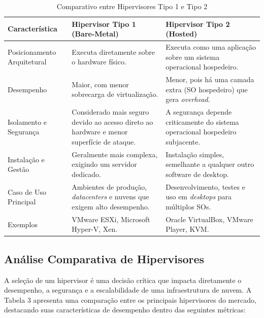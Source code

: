 \begin{table}[H]
    \centering
    \caption{Comparativo entre Hipervisores Tipo 1 e Tipo 2}
    \label{tab:comparativo_hipervisores}

    \begin{tabularx}{\textwidth}{|>{\raggedright\arraybackslash}p{}
                                 |>{\raggedright\arraybackslash}X
                                 |>{\raggedright\arraybackslash}X|}
        \hline
        \textbf{Característica} & \textbf{Hipervisor Tipo 1 (Bare-Metal)}
                                & \textbf{Hipervisor Tipo 2 (Hosted)} \\ \hline
        Posicionamento Arquitetural
            & Executa diretamente sobre o hardware físico.
            & Executa como uma aplicação sobre um sistema operacional hospedeiro. \\ \hline
        Desempenho
            & Maior, com menor sobrecarga de virtualização.
            & Menor, pois há uma camada extra (SO hospedeiro) que gera \textit{overhead}. \\ \hline
        Isolamento e Segurança
            & Considerado mais seguro devido ao acesso direto ao hardware e menor superfície de ataque.
            & A segurança depende criticamente do sistema operacional hospedeiro subjacente. \\ \hline
        Instalação e Gestão
            & Geralmente mais complexa, exigindo um servidor dedicado.
            & Instalação simples, semelhante a qualquer outro software de desktop. \\ \hline
        Caso de Uso Principal
            & Ambientes de produção, \textit{datacenters} e nuvens que exigem alto desempenho.
            & Desenvolvimento, testes e uso em \textit{desktops} para múltiplos SOs. \\ \hline
        Exemplos
            & VMware ESXi, Microsoft Hyper-V, Xen.
            & Oracle VirtualBox, VMware Player, KVM. \\ \hline
    \end{tabularx}

\end{table}



\subsection{Análise Comparativa de Hipervisores}
A seleção de um hipervisor é uma decisão crítica que impacta diretamente o desempenho, a segurança e a escalabilidade de uma infraestrutura de nuvem. A Tabela 3 apresenta uma comparação entre os principais hipervisores do mercado, destacando suas características de desempenho dentro das seguintes métricas:

